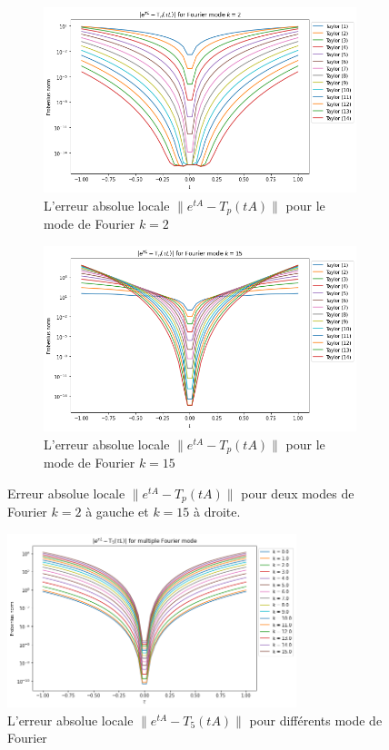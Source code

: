 \begin{figure}
  \begin{subfigure}{.5\textwidth}
    \centering
    \includegraphics[width=\textwidth]{img/approx_errortA2T.png}
    \caption{L'erreur absolue locale $\|e^{tA}-T_p(tA)\|$ pour le mode de Fourier $k=2$}
  \end{subfigure}
  \begin{subfigure}{.5\textwidth}
    \centering
    \includegraphics[width=\textwidth]{img/approx_errortA15T.png}
    \caption{L'erreur absolue locale $\|e^{tA}-T_p(tA)\|$ pour le mode de Fourier $k=15$}
  \end{subfigure}
  \caption{Erreur absolue locale $\|e^{tA}-T_p(tA)\|$ pour deux modes de Fourier $k=2$ à gauche et $k=15$ à droite.}
\end{figure}

\begin{figure}
  \centering
  \includegraphics[width=0.75\textwidth]{img/approx_errortAkT5.png}
  \caption{L'erreur absolue locale $\|e^{tA}-T_5(tA)\|$ pour différents mode de Fourier}
\end{figure}

